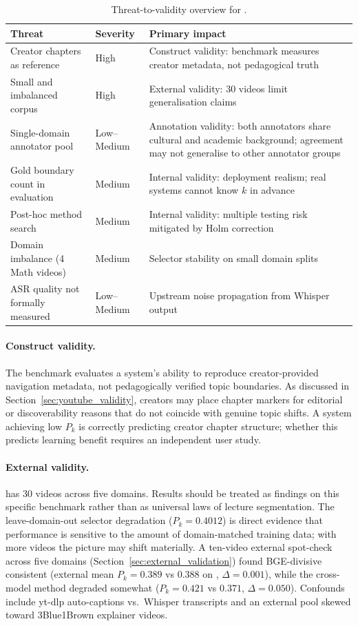 \begin{table}[h]
  \centering
  \caption{Threat-to-validity overview for \lecseg{}.}
  \label{tab:threats}
  \small
  \begin{tabular}{p{4.5cm}lp{5.5cm}}
    \toprule
    Threat & Severity & Primary impact \\
    \midrule
    Creator chapters as reference & High & Construct validity:
      benchmark measures creator metadata, not pedagogical truth \\
    Small and imbalanced corpus & High & External validity:
      30 videos limit generalisation claims \\
    Single-domain annotator pool & Low--Medium & Annotation validity:
      both annotators share cultural and academic background; agreement
      may not generalise to other annotator groups \\
    Gold boundary count in evaluation & Medium & Internal validity:
      deployment realism; real systems cannot know $k$ in advance \\
    Post-hoc method search & Medium & Internal validity:
      multiple testing risk mitigated by Holm correction \\
    Domain imbalance (4 Math videos) & Medium & Selector stability on
      small domain splits \\
    ASR quality not formally measured & Low--Medium & Upstream noise
      propagation from Whisper output \\
    \bottomrule
  \end{tabular}
\end{table}

\paragraph{Construct validity.}
The benchmark evaluates a system's ability to reproduce creator-provided
navigation metadata, not pedagogically verified topic boundaries.
As discussed in Section~\ref{sec:youtube_validity}, creators may place chapter
markers for editorial or discoverability reasons that do not coincide with
genuine topic shifts.
A system achieving low $P_k$ is correctly predicting creator chapter structure;
whether this predicts learning benefit requires an independent user study.

\paragraph{External validity.}
\dataset{} has 30 videos across five domains. Results should be treated as
findings on this specific benchmark rather than as universal laws of lecture
segmentation. The leave-domain-out selector degradation ($P_k=0.4012$) is
direct evidence that performance is sensitive to the amount of domain-matched
training data; with more videos the picture may shift materially.
A ten-video external spot-check across five domains
(Section~\ref{sec:external_validation}) found BGE-divisive
consistent (external mean $P_k=0.389$ vs $0.388$ on \dataset{},
$\Delta=0.001$), while the cross-model method degraded somewhat
($P_k=0.421$ vs $0.371$, $\Delta=0.050$).
Confounds include yt-dlp auto-captions vs.\ Whisper transcripts
and an external pool skewed toward 3Blue1Brown explainer videos.

